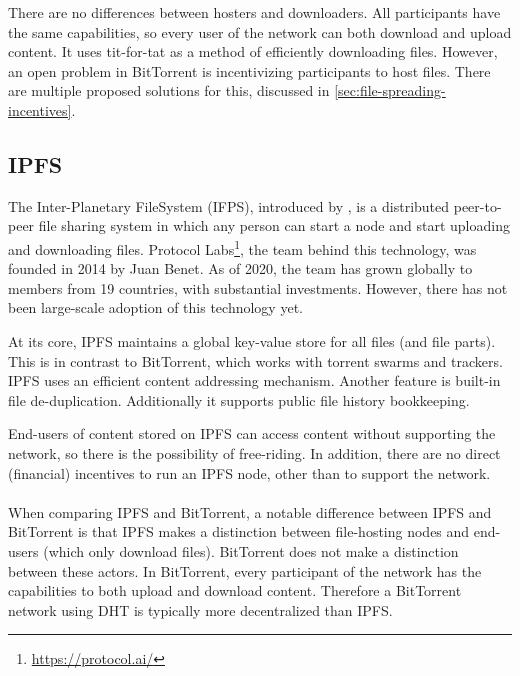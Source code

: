 There are no differences between hosters and downloaders. All participants have the same capabilities, so every user of the network can both download and upload content. It uses tit-for-tat as a method of efficiently downloading files. However, an open problem in BitTorrent is incentivizing participants to host files. There are multiple proposed solutions for this, discussed in \ref{sec:file-spreading-incentives}. 
\subsection{IPFS}
The Inter-Planetary FileSystem (IFPS), introduced by \cite{benet2014ipfs}, is a distributed peer-to-peer file sharing system in which any person can start a node and start uploading and downloading files. Protocol Labs\footnote{\url{https://protocol.ai/}}, the team behind this technology, was founded in 2014 by Juan Benet. As of 2020, the team has grown globally to members from 19 countries, with substantial investments. However, there has not been large-scale adoption of this technology yet.


At its core, IPFS maintains a global key-value store for all files (and file parts). This is in contrast to BitTorrent, which works with torrent swarms and trackers. IPFS uses an efficient content addressing mechanism. Another feature is built-in file de-duplication. Additionally it supports public file history bookkeeping.

End-users of content stored on IPFS can access content without supporting the network, so there is the possibility of free-riding. In addition, there are no direct (financial) incentives to run an IPFS node, other than to support the network. 
\\
\\
When comparing IPFS and BitTorrent, a notable difference between IPFS and BitTorrent is that IPFS makes a distinction between file-hosting nodes and end-users (which only download files). BitTorrent does not make a distinction between these actors. In BitTorrent, every participant of the network has the capabilities to both upload and download content. Therefore a BitTorrent network using DHT is typically more decentralized than IPFS. 

